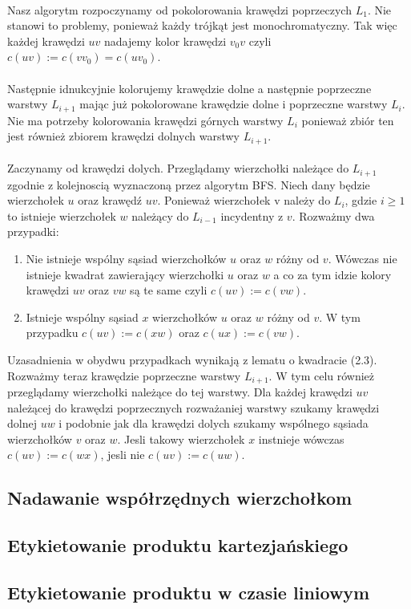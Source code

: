 \documentclass[12pt,a4paper,titlepage]{article}
\begin{document}
\\
Nasz algorytm rozpoczynamy od pokolorowania krawędzi poprzeczych $L_1$. Nie stanowi to problemy, ponieważ każdy trójkąt jest monochromatyczny. Tak więc każdej krawędzi $uv$ nadajemy kolor krawędzi $v_0 v$ czyli $c(uv):=c(v v_0 )=c(u v_0 )$.\\
\\
Następnie idnukcyjnie kolorujemy krawędzie dolne a następnie poprzeczne warstwy $L_{i+1}$ mając już pokolorowane krawędzie dolne i poprzeczne warstwy $L_i$. Nie ma potrzeby kolorowania krawędzi górnych warstwy $L_i$ ponieważ zbiór ten jest również zbiorem krawędzi dolnych warstwy $L_{i+1}$.\\
\\
Zaczynamy od krawędzi dolych. Przeglądamy wierzchołki należące do $L_{i+1}$ zgodnie z kolejnoscią wyznaczoną przez algorytm BFS. Niech dany będzie wierzchołek $u$ oraz krawędź $uv$. Ponieważ wierzchołek v należy do $L_i$, gdzie $i\geqslant 1$ to istnieje wierzchołek $w$ należący do $L_{i-1}$ incydentny z $v$. Rozważmy dwa przypadki:
\begin{enumerate}
\item Nie istnieje wspólny sąsiad wierzchołków $u$ oraz $w$ różny od $v$. Wówczas nie istnieje kwadrat zawierający wierzchołki $u$ oraz $w$ a co za tym idzie kolory krawędzi $uv$ oraz $vw$ są te same czyli $c(uv):=c(vw)$.
\item Istnieje wspólny sąsiad $x$ wierzchołków $u$ oraz $w$ różny od $v$. W tym przypadku $c(uv):=c(xw)$ oraz $c(ux):=c(vw)$. 
\end{enumerate}
Uzasadnienia w obydwu przypadkach wynikają z lematu o kwadracie (2.3).\\
Rozważmy teraz krawędzie poprzeczne warstwy $L_{i+1}$. W tym celu również przeglądamy wierzchołki należące do tej warstwy. Dla każdej krawędzi $uv$ należącej do krawędzi poprzecznych rozważaniej warstwy szukamy krawędzi dolnej $uw$ i podobnie jak dla krawędzi dolych szukamy wspólnego sąsiada wierzchołków $v$ oraz $w$. Jesli takowy wierzchołek $x$ instnieje wówczas $c(uv):=c(wx)$, jesli nie $c(uv):=c(uw)$.
\subsection{Nadawanie współrzędnych wierzchołkom}
\subsection{Etykietowanie produktu kartezjańskiego}
\subsection{Etykietowanie produktu w czasie liniowym}
\end{document}
